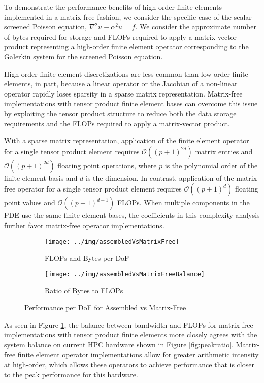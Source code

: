 To demonstrate the performance benefits of high-order finite elements implemented in a matrix-free fashion, we consider the specific case of the scalar screened Poisson equation, $\nabla^2 u - \alpha^2 u = f$.
We consider the approximate number of bytes required for storage and FLOPs required to apply a matrix-vector product representing a high-order finite element operator corresponding to the Galerkin system for the screened Poisson equation.

High-order finite element discretizations are less common than low-order finite elements, in part, because a linear operator or the Jacobian of a non-linear operator rapidly loses sparsity in a sparse matrix representation.
Matrix-free implementations with tensor product finite element bases can overcome this issue by exploiting the tensor product structure to reduce both the data storage requirements and the FLOPs required to apply a matrix-vector product.

With a sparse matrix representation, application of the finite element operator for a single tensor product element requires $\mathcal{O} \left( \left( p + 1 \right)^{2 d} \right)$ matrix entries and $\mathcal{O} \left( \left( p + 1 \right)^{2 d} \right)$ floating point operations, where $p$ is the polynomial order of the finite element basis and $d$ is the dimension.
In contrast, application of the matrix-free operator for a single tensor product element requires $\mathcal{O} \left( \left( p + 1 \right)^d \right)$ floating point values and $\mathcal{O} \left( \left( p + 1 \right)^{d + 1} \right)$ FLOPs.
When multiple components in the PDE use the same finite element bases, the coefficients in this complexity analysis further favor matrix-free operator implementations.

\begin{figure}[ht!]
\begin{subfigure}{.495\textwidth}
\texttt{[image: ../img/assembledVsMatrixFree]}
\caption{FLOPs and Bytes per DoF}
\end{subfigure}
\begin{subfigure}{.495\textwidth}
\texttt{[image: ../img/assembledVsMatrixFreeBalance]}
\caption{Ratio of Bytes to FLOPs}
\end{subfigure}
\caption{Performance per DoF for Assembled vs Matrix-Free}
\label{fig:assembledvsmatrixfree}
\end{figure}

As seen in Figure \ref{fig:assembledvsmatrixfree}, the balance between bandwidth and FLOPs for matrix-free implementations with tensor product finite elements more closely agrees with the system balance on current HPC hardware shown in Figure \ref{fig:peakratio}.
Matrix-free finite element operator implementations allow for greater arithmetic intensity at high-order, which allows these operators to achieve performance that is closer to the peak performance for this hardware.

